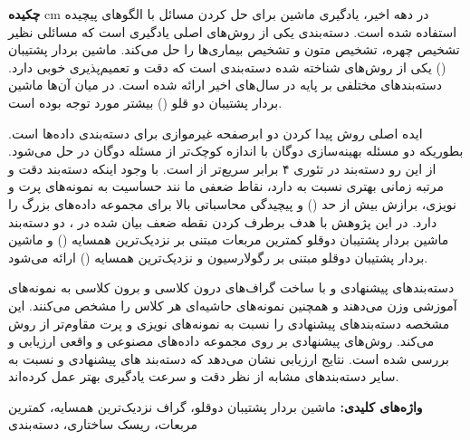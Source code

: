 
\thispagestyle{plain}


\noindent
\textbf{\Large چکیده}
 cm
\noindent در دهه اخیر، یادگیری ماشین برای حل کردن مسائل با الگوهای پیچیده استفاده شده است. دسته‌بندی یکی از روش‌های اصلی یادگیری است که مسائلی نظیر تشخیص چهره، تشخیص متون و تشخیص بیماری‌ها را حل می‌کند. ماشین بردار پشتیبان  () یکی از روش‌های شناخته شده  دسته‌بندی است که دقت و تعمیم‌پذیری خوبی دارد. دسته‌بندهای مختلفی بر پایه  در سال‌های اخیر ارائه شده است. در میان آن‌ها ماشین بردار پشتیبان دو قلو () بیشتر مورد توجه بوده است.

ایده اصلی روش  پیدا کردن دو ابرصفحه غیرموازی برای دسته‌بندی داده‌ها است. بطوریکه دو مسئله بهینه‌سازی دوگان با اندازه کوچک‌تر از مسئله دوگان در  حل می‌شود. از این رو دسته‌بند  در تئوری ۴ برابر سریع‌تر از  است. با وجود اینکه دسته‌بند  دقت و مرتبه زمانی بهتری نسبت به  دارد، نقاط ضعفی ما نند حساسیت به نمونه‌های پرت و نویزی، برازش بیش از حد () و پیچیدگی محاسباتی بالا برای مجموعه داده‌های بزرگ را دارد.  در این پژوهش با هدف برطرف کردن نقطه ضعف بیان شده در ، دو دسته‌بند ماشین بردار پشتیبان دوقلو کمترین مربعات مبتنی بر نزدیک‌ترین همسایه () و ماشین بردار پشتیبان دوقلو مبتنی بر رگولارسیون و نزدیک‌ترین همسایه () ارائه می‌شود.  

دسته‌بندهای پیشنهادی  و  با ساخت گراف‌های درون کلاسی و برون کلاسی به نمونه‌های آموزشی وزن می‌دهند و همچنین نمونه‌های حاشیه‌ای هر کلاس را مشخص می‌کنند. این مشخصه دسته‌بندهای پیشنهادی را نسبت به نمونه‌های نویزی و پرت مقاوم‌تر از روش   می‌کند. روش‌های پیشنهادی بر روی مجموعه داده‌های مصنوعی و واقعی ارزیابی و بررسی شده است. نتایج ارزیابی نشان می‌دهد که دسته‌بند های پیشنهادی  و  نسبت به سایر دسته‌بندهای مشابه از نظر دقت و سرعت یادگیری بهتر عمل کرده‌اند.




\vskip 2cm
\noindent
\textbf{واژه‌های کلیدی:} 
ماشین بردار پشتیبان دوقلو، گراف نزدیک‌ترین همسایه، کمترین مربعات، ریسک ساختاری، دسته‌بندی
